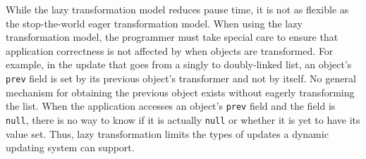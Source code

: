 While the lazy transformation model reduces pause time, it is not as
flexible as the stop-the-world eager transformation model. When using the
lazy transformation model, the programmer must take special care to ensure
that application correctness is not affected by when objects are
transformed.  For example, in the update that goes from a singly to
doubly-linked list, an object's {\tt prev} field is set by its previous
object's transformer and not by itself. No general mechanism for obtaining
the previous object exists without eagerly transforming the list.
When the application accesses an
object's {\tt prev} field and the field is {\tt null}, there is no way to
know if it is actually {\tt null} or whether it is yet to have its value set.
Thus, lazy transformation limits the types of updates a dynamic updating
system can support.


